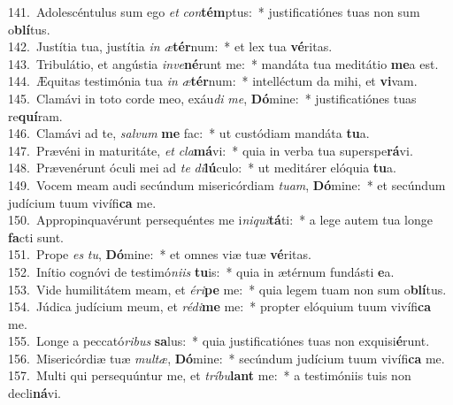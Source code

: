 {141.~}Adolescéntulus sum ego \textit{et} \textit{con}\textbf{tém}ptus:~* justificatiónes tuas non sum o\textbf{blí}tus.\\
{142.~}Justítia tua, justítia \textit{in} \textit{æ}\textbf{tér}num:~* et lex tua \textbf{vé}ritas.\\
{143.~}Tribulátio, et angústia \textit{in}\textit{ve}\textbf{né}runt me:~* mandáta tua meditátio \textbf{me}a est.\\
{144.~}Æquitas testimónia tua \textit{in} \textit{æ}\textbf{tér}num:~* intelléctum da mihi, et \textbf{vi}vam.\\
{145.~}Clamávi in toto corde meo, exáu\textit{di} \textit{me}, \textbf{Dó}mine:~* justificatiónes tuas re\textbf{quí}ram.\\
{146.~}Clamávi ad te, \textit{sal}\textit{vum} \textbf{me} fac:~* ut custódiam mandáta \textbf{tu}a.\\
{147.~}Prævéni in maturitáte, \textit{et} \textit{cla}\textbf{má}vi:~* quia in verba tua superspe\textbf{rá}vi.\\
{148.~}Prævenérunt óculi mei ad \textit{te} \textit{di}\textbf{lú}culo:~* ut meditárer elóquia \textbf{tu}a.\\
{149.~}Vocem meam audi secúndum misericórdiam \textit{tu}\textit{am}, \textbf{Dó}mine:~* et secúndum judícium tuum vivífi\textbf{ca} me.\\
{150.~}Appropinquavérunt persequéntes me i\textit{ni}\textit{qui}\textbf{tá}ti:~* a lege autem tua longe \textbf{fa}cti sunt.\\
{151.~}Prope \textit{es} \textit{tu}, \textbf{Dó}mine:~* et omnes viæ tuæ \textbf{vé}ritas.\\
{152.~}Inítio cognóvi de testimó\textit{ni}\textit{is} \textbf{tu}is:~* quia in ætérnum fundásti \textbf{e}a.\\
{153.~}Vide humilitátem meam, et \textit{é}\textit{ri}\textbf{pe} me:~* quia legem tuam non sum o\textbf{blí}tus.\\
{154.~}Júdica judícium meum, et \textit{ré}\textit{di}\textbf{me} me:~* propter elóquium tuum vivífi\textbf{ca} me.\\
{155.~}Longe a peccató\textit{ri}\textit{bus} \textbf{sa}lus:~* quia justificatiónes tuas non exquisi\textbf{é}runt.\\
{156.~}Misericórdiæ tuæ \textit{mul}\textit{tæ}, \textbf{Dó}mine:~* secúndum judícium tuum vivífi\textbf{ca} me.\\
{157.~}Multi qui persequúntur me, et \textit{trí}\textit{bu}\textbf{lant} me:~* a testimóniis tuis non decli\textbf{ná}vi.\\
